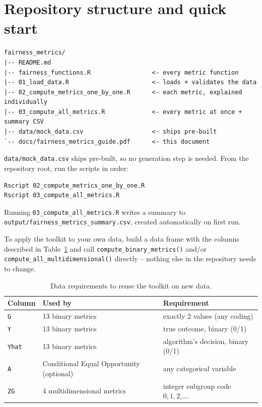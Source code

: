\documentclass[11pt]{article}
\begin{document}
\section{Repository structure and quick start}

\begin{verbatim}
fairness_metrics/
|-- README.md
|-- fairness_functions.R                 <- every metric function
|-- 01_load_data.R                       <- loads + validates the data
|-- 02_compute_metrics_one_by_one.R      <- each metric, explained individually
|-- 03_compute_all_metrics.R             <- every metric at once + summary CSV
|-- data/mock_data.csv                   <- ships pre-built
`-- docs/fairness_metrics_guide.pdf      <- this document
\end{verbatim}

\texttt{data/mock\_data.csv} ships pre-built, so no generation step is needed.
From the repository root, run the scripts in order:

\begin{verbatim}
Rscript 02_compute_metrics_one_by_one.R
Rscript 03_compute_all_metrics.R
\end{verbatim}

Running \texttt{03\_compute\_all\_metrics.R} writes a summary to
\texttt{output/fairness\_metrics\_summary.csv}, created automatically on first
run.

To apply the toolkit to your own data, build a data frame with the columns
described in Table~\ref{tab:datareq} and call \texttt{compute\_binary\_metrics()}
and/or \texttt{compute\_all\_multidimensional()} directly -- nothing else in
the repository needs to change.

\begin{table}[h]
\centering
\begin{tabular}{lll}
\toprule
Column & Used by & Requirement \\
\midrule
\texttt{G}    & 13 binary metrics & exactly 2 values (any coding) \\
\texttt{Y}    & 13 binary metrics & true outcome, binary (0/1) \\
\texttt{Yhat} & 13 binary metrics & algorithm's decision, binary (0/1) \\
\texttt{A}    & Conditional Equal Opportunity (optional) & any categorical variable \\
\texttt{ZG}   & 4 multidimensional metrics & integer subgroup code $0,1,2,\dots$ \\
\bottomrule
\end{tabular}
\caption{Data requirements to reuse the toolkit on new data.}
\label{tab:datareq}
\end{table}
\end{document}
